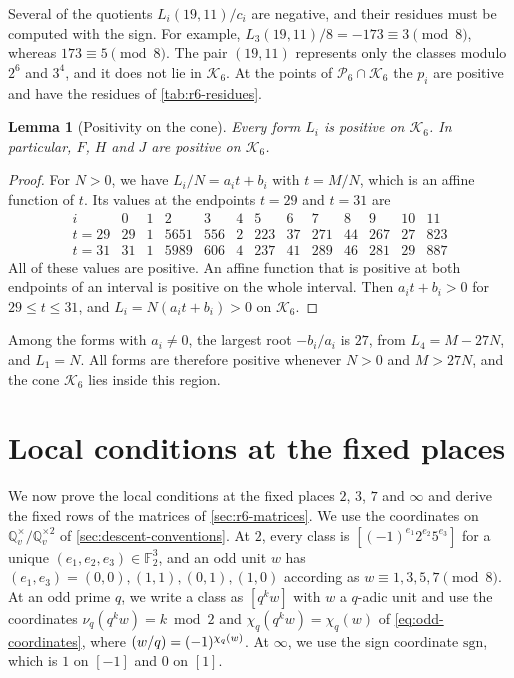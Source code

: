 \documentclass[12pt,oneside,openany]{book}
\theoremstyle{definition}
\theoremstyle{plain}
\numberwithin{equation}{chapter}
\theoremstyle{plain}
\newtheorem{lemma}[lemma]{Lemma}
\theoremstyle{definition}
\theoremstyle{remark}
\newcommand{\Q}{\mathbb Q}
\newcommand{\F}{\mathbb F}
\newcommand{\leg}[2]{\mathchoice{\left(\frac{#1}{#2}\right)}{(#1/#2)}{(#1/#2)}{(#1/#2)}}
\newcommand{\sq}[1]{[#1]}
\newcommand{\sqgp}[1]{#1^{\times}/#1^{\times2}}
\newcommand{\cP}{\mathcal P}
\newcommand{\cK}{\mathcal K}
\begin{document}
Several of the quotients $L_i(19,11)/c_i$ are negative, and their residues must be computed with the sign. For example, $L_3(19,11)/8=-173\equiv3\pmod8$, whereas $173\equiv5\pmod8$. The pair $(19,11)$ represents only the classes modulo $2^6$ and $3^4$, and it does not lie in $\cK_6$. At the points of $\cP_6\cap\cK_6$ the $p_i$ are positive and have the residues of \cref{tab:r6-residues}.

\begin{lemma}[Positivity on the cone]\label{lem:r6-cone}
Every form $L_i$ is positive on $\cK_6$. In particular, $F$, $H$ and $J$ are positive on $\cK_6$.
\end{lemma}

\begin{proof}
For $N>0$, we have $L_i/N=a_it+b_i$ with $t=M/N$, which is an affine function of $t$. Its values at the endpoints $t=29$ and $t=31$ are
\[
\begin{array}{c|rrrrrrrrrrrr}
i & 0 & 1 & 2 & 3 & 4 & 5 & 6 & 7 & 8 & 9 & 10 & 11\\
\hline
t=29 & 29 & 1 & 5651 & 556 & 2 & 223 & 37 & 271 & 44 & 267 & 27 & 823\\
t=31 & 31 & 1 & 5989 & 606 & 4 & 237 & 41 & 289 & 46 & 281 & 29 & 887
\end{array}
\]
All of these values are positive. An affine function that is positive at both endpoints of an interval is positive on the whole interval. Then $a_it+b_i>0$ for $29\le t\le31$, and $L_i=N(a_it+b_i)>0$ on $\cK_6$.
\end{proof}

Among the forms with $a_i\ne0$, the largest root $-b_i/a_i$ is $27$, from $L_4=M-27N$, and $L_1=N$. All forms are therefore positive whenever $N>0$ and $M>27N$, and the cone $\cK_6$ lies inside this region.

\section{Local conditions at the fixed places}\label{sec:r6-fixed}

We now prove the local conditions at the fixed places $2$, $3$, $7$ and $\infty$ and derive the fixed rows of the matrices of \cref{sec:r6-matrices}. We use the coordinates on $\sqgp{\Q_v}$ of \cref{sec:descent-conventions}. At $2$, every class is $\sq{(-1)^{e_1}2^{e_2}5^{e_3}}$ for a unique $(e_1,e_2,e_3)\in\F_2^3$, and an odd unit $w$ has $(e_1,e_3)=(0,0),(1,1),(0,1),(1,0)$ according as $w\equiv1,3,5,7\pmod8$. At an odd prime $q$, we write a class as $\sq{q^kw}$ with $w$ a $q$-adic unit and use the coordinates $\nu_q(q^kw)=k\bmod2$ and $\chi_q(q^kw)=\chi_q(w)$ of \eqref{eq:odd-coordinates}, where $\leg wq=(-1)^{\chi_q(w)}$. At $\infty$, we use the sign coordinate $\mathrm{sgn}$, which is $1$ on $\sq{-1}$ and $0$ on $\sq1$.
\end{document}
